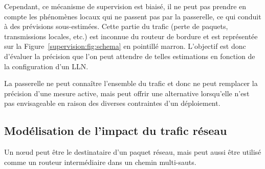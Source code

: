 
Cependant, ce mécanisme de supervision est biaisé, il ne peut pas prendre en compte les phénomènes locaux qui ne passent pas par la passerelle, ce qui conduit à des prévisions sous-estimées.
Cette partie du trafic (perte de paquets, transmissions locales, etc.) est inconnue du routeur de bordure et est représentée sur la Figure~\ref{supervision:fig:schema} en pointillé marron.
L'objectif est donc d'évaluer la précision que l'on peut attendre de telles estimations en fonction de la configuration d'un \ac{LLN}.


La passerelle ne peut connaître l'ensemble du trafic et donc ne peut remplacer la précision d'une mesure active, mais peut offrir une alternative lorsqu'elle n'est pas envisageable en raison des diverses contraintes d'un déploiement.

\subsection{Modélisation de l'impact du trafic réseau}

Un nœud peut être le destinataire d'un paquet réseau, mais peut aussi être utilisé comme un routeur intermédiaire dans un chemin multi-sauts.

